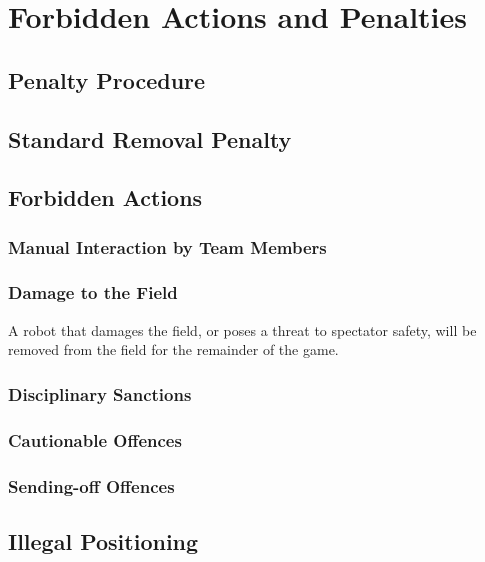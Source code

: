 \section{Forbidden Actions and Penalties}
\label{sec:forbidden_actions}

\subsection{Penalty Procedure}
\label{sec:penalty_procedure}

\subsection{Standard Removal Penalty}
\label{sec:removal_penalty}

\subsection{Forbidden Actions}
\label{sec:forbidden_actions}

\subsubsection{Manual Interaction by Team Members}
\subsubsection{Damage to the Field}
\label{sec:damage}

A robot that damages the field, or poses a threat to spectator safety, will be removed from the field for the remainder of the game.

\subsubsection{Disciplinary Sanctions}
\subsubsection{Cautionable Offences}
\subsubsection{Sending-off Offences}

\subsection{Illegal Positioning}
\label{sec:illegal_positioning}

